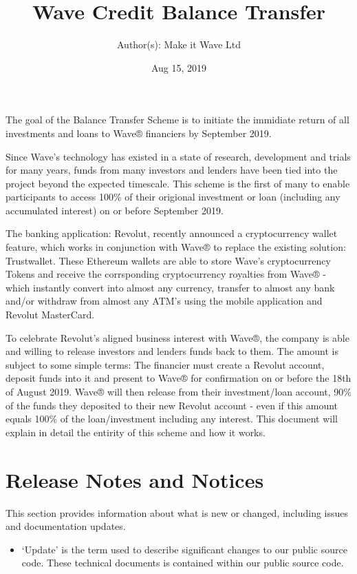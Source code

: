 \documentclass[letterpaper,10pt,openany,oneside,english]{sphinxmanual}
\title{Wave Credit Balance Transfer}
\date{Aug 15, 2019}
\author{Author(s): Make it Wave Ltd}
\begin{document}
\maketitle
\sphinxtableofcontents
{}\label{\detokenize{index::doc}}


The goal of the Balance Transfer Scheme is to initiate the immidiate return of all investments and loans to Wave® financiers by September 2019.

Since Wave’s technology has existed in a state of research, development and trials for many years, funds from many investors and lenders have been tied into the project beyond the expected timescale. This scheme is the first of many to enable participants to access 100\% of their origional investment or loan (including any accumulated interest) on or before September 2019.

The banking application: Revolut, recently announced a cryptocurrency wallet feature, which works in conjunction with Wave® to replace the existing solution: Trustwallet. These Ethereum wallets are able to store Wave’s cryptocurrency Tokens and receive the corrsponding cryptocurrency royalties from Wave® - which instantly convert into almost any currency, transfer to almost any bank and/or withdraw from almost any ATM’s using the mobile application and Revolut MasterCard.

To celebrate Revolut’s aligned business interest with Wave®, the company is able and willing to release investors and lenders funds back to them. The amount is subject to some simple terms: The financier must create a Revolut account, deposit funds into it and present to Wave® for confirmation on or before the 18th of August 2019. Wave® will then release from their investment/loan account, 90\% of the funds they deposited to their new Revolut account - even if this amount equals 100\% of the loan/investment including any interest. This document will explain in detail the entirity of this scheme and how it works.


\chapter{Release Notes and Notices}
\label{\detokenize{releasenotes:release-notes-and-notices}}\label{\detokenize{releasenotes::doc}}
This section provides information about what is new or changed, including issues and documentation updates.
\begin{itemize}
\item {} 
‘Update’ is the term used to describe significant changes to our public source code. These technical documents is contained within our public source code.

\end{itemize}
\end{document}
